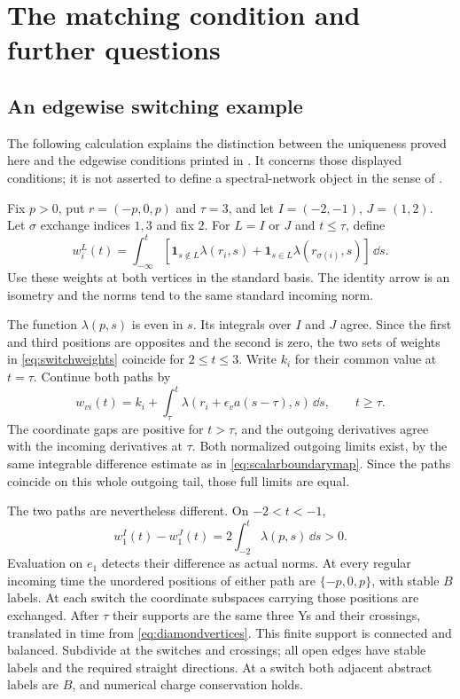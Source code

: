 \section{The matching condition and further questions}\label{sec:comparison}

\subsection{An edgewise switching example}
The following calculation explains the distinction between the uniqueness
proved here and the edgewise conditions printed in
\cite[Definition~7.8]{HKKP26}. It concerns those displayed conditions;
it is not asserted to define a spectral-network object in the sense of
\cite{HKS24}.

Fix $p>0$, put $r=(-p,0,p)$ and $\tau=3$, and let
$I=(-2,-1)$, $J=(1,2)$. Let $\sigma$ exchange indices $1,3$
and fix $2$. For $L=I$ or $J$ and $t\le\tau$, define
\begin{equation}\label{eq:switchweights}
 w_i^L(t)=\int_{-\infty}^t
 \left[\boldsymbol1_{s\notin L}\lambda(r_i,s)
       +\boldsymbol1_{s\in L}\lambda(r_{\sigma(i)},s)\right]\,\dd s.
\end{equation}
Use these weights at both vertices in the standard basis.
The identity arrow is an isometry and the norms tend to the
same standard incoming norm.

The function $\lambda(p,s)$ is even in $s$. Its integrals over
$I$ and $J$ agree. Since the first and third positions are
opposites and the second is zero, the two sets of weights in
\eqref{eq:switchweights} coincide for $2\le t\le3$.
Write $k_i$ for their common value at $t=\tau$. Continue both
paths by
\[
 w_{vi}(t)=k_i+
   \int_\tau^t\lambda(r_i+\epsilon_va(s-\tau),s)\,\dd s,
 \qquad t\ge\tau.
\]
The coordinate gaps are positive for $t>\tau$, and the
outgoing derivatives agree with the incoming derivatives
at $\tau$. Both normalized outgoing limits exist, by the
same integrable difference estimate as in
\eqref{eq:scalarboundarymap}. Since the paths coincide on
this whole outgoing tail, those full limits are equal.

The two paths are nevertheless different. On $-2<t<-1$,
\[
 w_1^I(t)-w_1^J(t)
       =2\int_{-2}^t\lambda(p,s)\,\dd s>0.
\]
Evaluation on $e_1$ detects their difference as actual norms.
At every regular incoming time the unordered positions of
either path are $\{-p,0,p\}$, with stable $B$ labels.
At each switch the coordinate subspaces carrying those
positions are exchanged. After $\tau$ their supports are
the same three Ys and their crossings, translated in time
from \eqref{eq:diamondvertices}. This finite support is
connected and balanced. Subdivide at the switches and
crossings; all open edges have stable labels and the required
straight directions. At a switch both adjacent abstract
labels are $B$, and numerical charge conservation holds.

